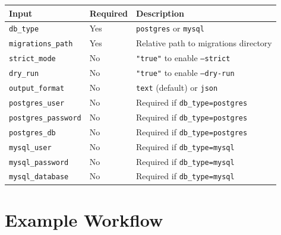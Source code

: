 \documentclass[12pt,a4paper]{report}
\begin{document}
\begin{center}
\begin{tabular}{@{}llp{6.5cm}@{}}
\toprule
\textbf{Input} & \textbf{Required} & \textbf{Description} \\
\midrule
\texttt{db\_type}           & Yes & \texttt{postgres} or \texttt{mysql} \\
\texttt{migrations\_path}   & Yes & Relative path to migrations directory \\
\texttt{strict\_mode}       & No  & \texttt{"true"} to enable \texttt{--strict} \\
\texttt{dry\_run}           & No  & \texttt{"true"} to enable \texttt{--dry-run} \\
\texttt{output\_format}     & No  & \texttt{text} (default) or \texttt{json} \\
\texttt{postgres\_user}     & No  & Required if \texttt{db\_type=postgres} \\
\texttt{postgres\_password} & No  & Required if \texttt{db\_type=postgres} \\
\texttt{postgres\_db}       & No  & Required if \texttt{db\_type=postgres} \\
\texttt{mysql\_user}        & No  & Required if \texttt{db\_type=mysql} \\
\texttt{mysql\_password}    & No  & Required if \texttt{db\_type=mysql} \\
\texttt{mysql\_database}    & No  & Required if \texttt{db\_type=mysql} \\
\bottomrule
\end{tabular}
\end{center}

\section{Example Workflow}
\end{document}
